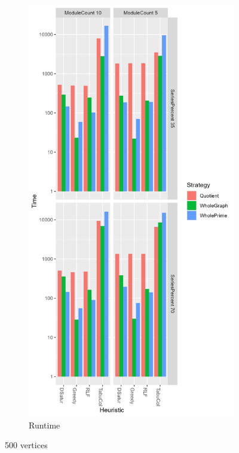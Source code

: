 \documentclass[a4paper]{article}
\begin{document}
\begin{figure}
\begin{subfigure}{.5\paperwidth}
    \end{subfigure}%
    \begin{subfigure}{.5\paperwidth}
        \includegraphics[width=\columnwidth]{Tables/500Time.png}
      \caption{Runtime}
      \label{fig:500t}
    \end{subfigure}
\caption{500 vertices}
\label{fig:500}
\end{figure}
\end{document}
